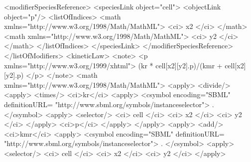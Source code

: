 \documentclass{cekarticle}
\begin{document}
\begin{example}
                <modifierSpeciesReference>
                    <speciesLink object="cell">
                        <objectLink object="p"/>
                        <listOfIndices>
                            <math xmlns="http://www.w3.org/1998/Math/MathML">
                                <ci> x2 </ci>
                            </math>
                            <math xmlns="http://www.w3.org/1998/Math/MathML">
                                <ci> y2 </ci>
                            </math>
                        </listOfIndices>
                    </speciesLink>
                </modifierSpeciesReference>
            </listOfModifiers>
            <kineticLaw>
                <note>
                    <p xmlns="http://www.w3.org/1999/xhtml">
                        (kr * cell[x2][y2].p)/(kmr + cell[x2][y2].p)
                    </p>
                </note>
                <math xmlns="http://www.w3.org/1998/Math/MathML">
                    <apply>
                        <divide/>
                        <apply>
                            <times/>
                            <ci>kr</ci>
                            <apply>
                                <csymbol
                                    encoding="SBML"
                                    definitionURL=
                                        "http://www.sbml.org/symbols/instanceselector">
                                    .
                                </csymbol>
                                <apply>
                                    <selector/>
                                    <ci> cell </ci>
                                    <ci> x2 </ci>
                                    <ci> y2 </ci>
                                </apply>
                                <ci>p</ci>
                            </apply>
                        </apply>    
                        <apply>
                            <add/>
                            <ci>kmr</ci>
                            <apply>
                                <csymbol
                                    encoding="SBML"
                                    definitionURL=
                                        "http://www.sbml.org/symbols/instanceselector">
                                    .
                                </csymbol>
                                <apply>
                                    <selector/>
                                    <ci> cell </ci>
                                    <ci> x2 </ci>
                                    <ci> y2 </ci>
                                </apply>

\end{example}
\end{document}
